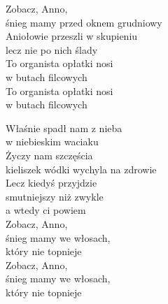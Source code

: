 \begin{text}
    Zobacz, Anno,\\
    śnieg mamy przed oknem grudniowy\\
    Aniołowie przeszli w skupieniu\\
    lecz nie po nich ślady\\
    To organista opłatki nosi\\
    w butach filcowych\\
    To organista opłatki nosi\\
    w butach filcowych

    Właśnie spadł nam z nieba\\
    w niebieskim waciaku\\
    Życzy nam szczęścia\\
    kieliszek wódki wychyla na zdrowie\\
    Lecz kiedyś przyjdzie\\
    smutniejszy niż zwykle\\
    a wtedy ci powiem\\
    Zobacz, Anno,\\
    śnieg mamy we włosach,\\
    który nie topnieje\\
    Zobacz, Anno,\\
    śnieg mamy we włosach,\\
    który nie topnieje
\end{text}
\begin{chord}

\end{chord}